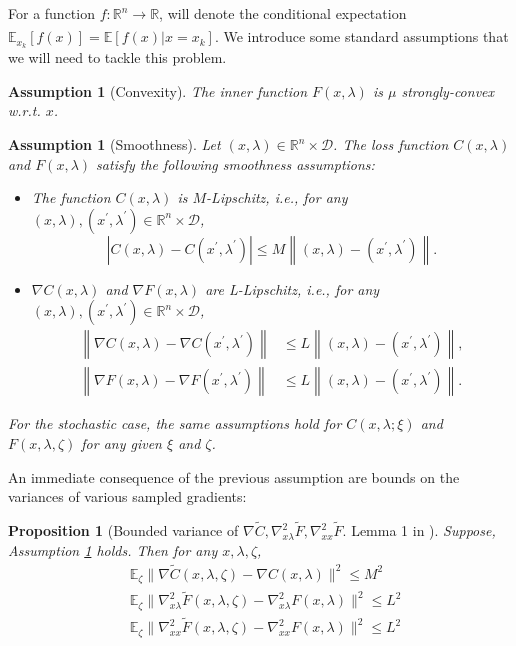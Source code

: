 \documentclass[11pt, twoside]{report}
\newtheorem{proposition}[theorem]{Proposition}
\newtheorem{assumption}[theorem]{Assumption}
\begin{document}
For a function $f:\mathbb{R}^n \xrightarrow[]{} \mathbb{R}$, will denote the conditional expectation $\mathbb{E}_{x_k} [f(x)] = \mathbb{E}[f(x) | x = x_k].$ We introduce some standard assumptions that we will need to tackle this problem.


\begin{assumption}[Convexity] \label{conv_ass}
    The inner function $F(x, \lambda)$ is $\mu$ strongly-convex w.r.t. $x$.
\end{assumption}

\begin{assumption}[Smoothness] \label{smo_ass}
Let $(x,\lambda) \in \mathbb{R}^{n} \times \mathcal{D}$. The loss function $C(x,\lambda)$ and $F(x,\lambda)$ satisfy the following smoothness assumptions:
\begin{itemize}
    \item The function $C(x,\lambda)$ is $M$-Lipschitz, i.e., for any $(x,\lambda), (x^{\prime},\lambda^{\prime}) \in \mathbb{R}^{n} \times \mathcal{D}$,
$$
\left|C(x,\lambda)-C(x^{\prime},\lambda^{\prime})\right| \leq M\left\|(x,\lambda)-(x^{\prime},\lambda^{\prime})\right\| .
$$
    \item $\nabla C(x,\lambda)$ and $\nabla F(x,\lambda)$ are L-Lipschitz, i.e., for any $(x,\lambda), (x^{\prime},\lambda^{\prime}) \in \mathbb{R}^{n} \times \mathcal{D}$,
$$
\begin{aligned}
\left\|\nabla C(x,\lambda)-\nabla C(x^{\prime},\lambda^{\prime})\right\| & \leq L\left\|(x,\lambda)-(x^{\prime},\lambda^{\prime})\right\|, \\
\left\|\nabla F(x,\lambda)-\nabla F(x^{\prime},\lambda^{\prime})\right\| & \leq L\left\|(x,\lambda)-(x^{\prime},\lambda^{\prime})\right\| .
\end{aligned}
$$
\end{itemize}
For the stochastic case, the same assumptions hold for $C(x,\lambda ; \xi)$ and $F(x,\lambda, \zeta)$ for any given $\xi$ and $\zeta$.
\end{assumption}

An immediate consequence of the previous assumption are bounds on the variances of various sampled gradients:
\begin{proposition}[Bounded variance of $\nabla \tilde{C}, \nabla_{x\lambda}^2 \tilde{F},\nabla_{xx}^2 \tilde{F}$. Lemma 1 in \cite{ji2021bilevel}] \label{boun_var}
    Suppose, Assumption \ref{smo_ass} holds. Then for any $x,\lambda,\zeta$,
    \begin{align*}
        &\mathbb{E}_\zeta \|\nabla \tilde{C}(x,\lambda,\zeta) - \nabla C(x,\lambda)\|^2 \leq M^2 \\
        &\mathbb{E}_\zeta \|\nabla_{x\lambda}^2 \tilde{F}(x,\lambda,\zeta) - \nabla_{x\lambda}^2 F(x,\lambda)\|^2 \leq L^2 \\
        &\mathbb{E}_\zeta \|\nabla_{xx}^2 \tilde{F}(x,\lambda,\zeta) - \nabla_{xx}^2 F(x,\lambda)\|^2 \leq L^2 
    \end{align*}
\end{proposition}
\end{document}

